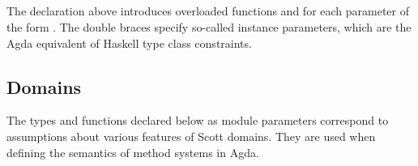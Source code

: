\begin{AgdaAlign}
\begin{code}
\>[2]\AgdaSpace{}%
\AgdaSymbol{(}\AgdaSymbol{;}\AgdaSpace{}%
\AgdaOperator{\AgdaInductiveConstructor{\AgdaUnderscore{},\AgdaUnderscore{}}}\AgdaSymbol{;}\AgdaSpace{}%
\AgdaSymbol{;}\AgdaSpace{}%
\AgdaSymbol{)}%
\>[34]\<%
\\
\>[0]\AgdaSpace{}%
\AgdaSpace{}%
\<%
\\
\>[0][@{}l@{\AgdaIndent{0}}]%
\>[2]\AgdaSpace{}%
\AgdaSymbol{(}\AgdaSymbol{;}\AgdaSpace{}%
\AgdaSymbol{;}\AgdaSpace{}%
\AgdaSymbol{)}%
\>[34]\<%
\\
\>[0]\AgdaSpace{}%
\AgdaSpace{}%
\AgdaSymbol{\{\{}\AgdaSpace{}%
\AgdaSpace{}%
\AgdaSymbol{\}\}}\<%
\\
\>[0][@{}l@{\AgdaIndent{0}}]%
\>[2]\AgdaSpace{}%
\AgdaSymbol{(}\AgdaSymbol{;}\AgdaSpace{}%
\AgdaSymbol{)}%
\>[34]\<%
\end{code}
%
The declaration  above introduces overloaded functions
 and  for each parameter of the form .
The double braces specify so-called instance parameters,
which are the Agda equivalent of Haskell type class constraints.

\subsection{Domains}

The types and functions declared below as module parameters
correspond to assumptions about various features of Scott domains.
They are used when defining the semantics of method systems in Agda.


\end{AgdaAlign}
